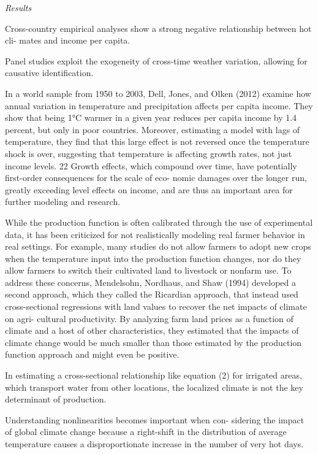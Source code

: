 \documentclass[
]{book}
\begin{document}
\emph{Results}

Cross-country empirical analyses show a
strong negative relationship between hot cli-
mates and income per capita.

Panel studies exploit the exogeneity of
cross-time weather variation, allowing for
causative identification.

In a world sample from 1950 to 2003, Dell,
Jones, and Olken (2012) examine how annual
variation in temperature and precipitation
affects per capita income. They show that
being 1°C warmer in a given year reduces
per capita income by 1.4 percent, but only
in poor countries. Moreover, estimating a
model with lags of temperature, they find
that this large effect is not reversed once
the temperature shock is over, suggesting
that temperature is affecting growth rates,
not just income levels. 22 Growth effects,
which compound over time, have potentially
first-order consequences for the scale of eco-
nomic damages over the longer run, greatly
exceeding level effects on income, and are
thus an important area for further modeling
and research.

While the production function is
often calibrated through the use of experimental
data, it has been criticized for not
realistically modeling real farmer behavior in
real settings. For example, many studies do
not allow farmers to adopt new crops when
the temperature input into the production
function changes, nor do they allow farmers
to switch their cultivated land to livestock or
nonfarm use.
To address these concerns, Mendelsohn,
Nordhaus, and Shaw (1994) developed a
second approach, which they called the
Ricardian approach, that instead used
cross-sectional regressions with land values
to recover the net impacts of climate on agri-
cultural productivity. By analyzing farm land
prices as a function of climate and a host of
other characteristics, they estimated that the
impacts of climate change would be much
smaller than those estimated by the production
function approach and might even be
positive.

In estimating a
cross-sectional relationship like equation (2)
for irrigated areas, which transport water
from other locations, the localized climate
is not the key determinant of production.

Understanding
nonlinearities becomes important when con-
sidering the impact of global climate change
because a right-shift in the distribution of
average temperature causes a disproportionate
increase in the number of very hot days.
\end{document}
